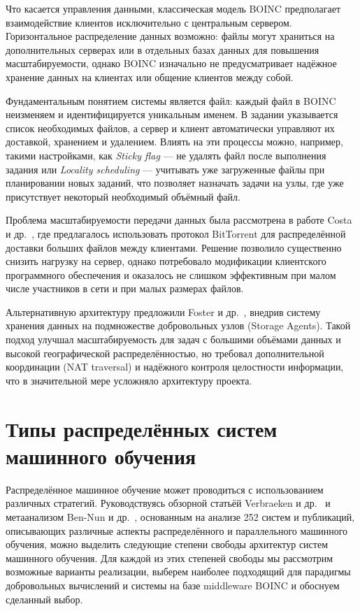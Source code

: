 \documentclass[a4paper,12pt]{extarticle}
\begin{document}
Что касается управления данными, классическая модель BOINC предполагает взаимодействие клиентов исключительно с центральным сервером.
Горизонтальное распределение данных возможно: файлы могут храниться на дополнительных серверах или в отдельных базах данных для повышения масштабируемости, однако BOINC изначально не предусматривает надёжное хранение данных на клиентах или общение клиентов между собой.

Фундаментальным понятием системы является файл: каждый файл в BOINC неизменяем и идентифицируется уникальным именем.
В задании указывается список необходимых файлов, а сервер и клиент автоматически управляют их доставкой, хранением и удалением.
Влиять на эти процессы можно, например, такими настройками, как \textit{Sticky flag} — не удалять файл после выполнения задания или \textit{Locality scheduling} — учитывать уже загруженные файлы при планировании новых заданий, что позволяет назначать задачи на узлы, где уже присутствует некоторый необходимый объёмный файл.

Проблема масштабируемости передачи данных была рассмотрена в работе Costa и др.~\cite{costa2008optimizing}, где предлагалось использовать протокол BitTorrent для распределённой доставки больших файлов между клиентами.
Решение позволило существенно снизить нагрузку на сервер, однако потребовало модификации клиентского программного обеспечения и оказалось не слишком эффективным при малом числе участников в сети и при малых размерах файлов.

Альтернативную архитектуру предложили Foster и др.~\cite{alonso2017new}, внедрив систему хранения данных на подмножестве добровольных узлов (Storage Agents).
Такой подход улучшал масштабируемость для задач с большими объёмами данных и высокой географической распределённостью, но требовал дополнительной координации (NAT traversal) и надёжного контроля целостности информации, что в значительной мере усложняло архитектуру проекта.

\section{Типы распределённых систем машинного обучения}

Распределённое машинное обучение может проводиться с использованием различных стратегий.
Руководствуясь обзорной статьёй Verbraeken и др.~\cite{verbraeken2020survey} и метаанализом Ben-Nun и др.~\cite{ben-nun2019demystifying}, основанным на анализе 252 систем и публикаций, описывающих различные аспекты распределённого и параллельного машинного обучения, можно выделить следующие степени свободы архитектур систем машинного обучения.
Для каждой из этих степеней свободы мы рассмотрим возможные варианты реализации, выберем наиболее подходящий для парадигмы добровольных вычислений и системы на базе middleware BOINC и обоснуем сделанный выбор.
\end{document}
